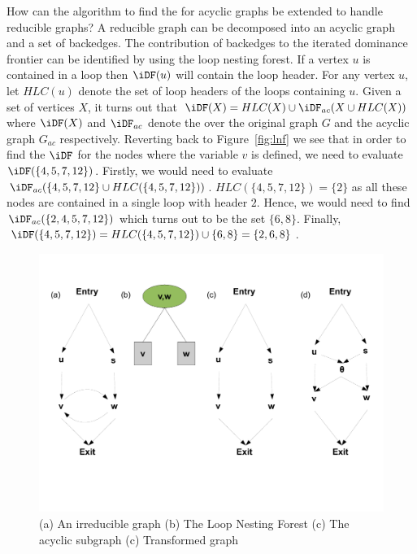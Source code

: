{    How can the algorithm to find the \iDF for acyclic graphs be extended to handle reducible graphs? 
    A reducible graph can be
    decomposed into an acyclic graph and a set of backedges. The contribution of backedges to the
    iterated dominance frontier can be identified by using the loop nesting forest. If a vertex $u$
    is contained in a loop then $\iDF(u)$ will contain the loop header. For any vertex $u$, let $HLC(u)$
    denote the set of loop headers of the loops containing $u$. Given a set of vertices $X$, it turns
    out that $\iDF(X) = HLC(X) \cup \iDF_{ac}(X \cup HLC(X))$ where $\iDF(X)$ and $\iDF_{ac}$
    denote the \iDF over the original graph $G$ and the acyclic graph $G_{ac}$ respectively. Reverting
    back to Figure~\ref{fig:lnf} we see that in order to find the $\iDF$ for the nodes where the variable 
    $v$ is defined, we need to evaluate $\iDF(\{4,5,7,12\})$. Firstly, we would need to evaluate 
    $\iDF_{ac}(\{4,5,7,12\} \cup HLC(\{4,5,7,12\}))$. $HLC(\{4,5,7,12\}) = \{2\}$ as all these nodes are contained 
    in a single loop with header $2$. Hence, we would need to find $\iDF_{ac}(\{2,4,5,7,12\})$ which turns
    out to be the set $\{6,8\}$. Finally, $\iDF(\{4,5,7,12\}) = HLC(\{4,5,7,12\}) \cup \{6,8\} = \{2,6,8\}$.
 
    \begin{figure}[htb]
    \centerline{\includegraphics[scale=0.3]{irred.pdf}}
    \caption{(a) An irreducible graph (b) The Loop Nesting Forest (c) The acyclic subgraph (c) Transformed
    graph}
    \label{fig:irred}
    \end{figure} 
 
}
